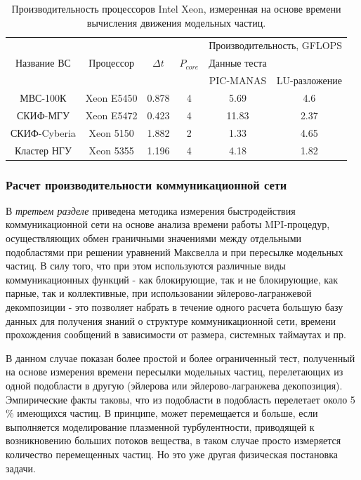 \begin{table}[ht]
	\caption{Производительность процессоров Intel Xeon, измеренная на основе времени вычисления движения модельных частиц.}
	\label{PIC_vs_PROC_RAM}
	\begin{tabular}{|c|c|c|c|c|c|}
		\hline
		&            &            &             &       \multicolumn{2}{|c|}{Производительность, GFLOPS} \\ \cline{5-6}  	
		Название ВС  & Процессор  &  $\Delta t$ &$P_{core}$ & Данные теста  &  \\
		             &            &             &           & PIC-MANAS     & LU-разложение \\ \hline
		МВС-100К     & Xeon E5450 &  0.878      & 4     & 5.69           & 4.6     \\ \hline 
		СКИФ-МГУ     & Xeon E5472 &  0.423      & 4     & 11.83          & 2.37       \\ \hline     
		СКИФ-Cyberia & Xeon 5150  &  1.882      & 2     &  1.33          & 4.65    \\ \hline
		Кластер НГУ  & Xeon 5355  &  1.196      & 4     & 4.18           & 1.82       \\ \hline
	\end{tabular}	
\end{table}






\subsubsection{Расчет производительности коммуникационной сети}
\label{perfCommNet}
В \textit{третьем разделе} приведена методика измерения быстродействия коммуникационной сети на основе анализа времени работы MPI-процедур, осуществляющих обмен граничными значениями между отдельными подобластями при решении уравнений Максвелла и при пересылке модельных частиц. В силу того, что при этом используются различные виды коммуникационных функций  - как блокирующие, так и не блокирующие, как парные, так и коллективные, при использовании эйлерово-лагранжевой декомпозиции - это позволяет набрать в течение одного расчета большую базу данных для получения знаний о структуре коммуникационной сети, времени прохождения сообщений в зависимости от размера, системных таймаутах и пр. 

В данном случае показан более простой и более ограниченный тест, полученный на основе измерения времени пересылки модельных частиц, перелетающих из одной подобласти в другую (эйлерова или эйлерово-лагранжева декопозиция). Эмпирические факты таковы, что из подобласти в подобласть перелетает около 5 \% имеющихся частиц. В принципе, может перемещается и больше, если выполняется моделирование плазменной турбулентности, приводящей к возникновению больших потоков вещества, в таком случае просто измеряется количество перемещенных частиц. Но это уже другая физическая постановка задачи.

